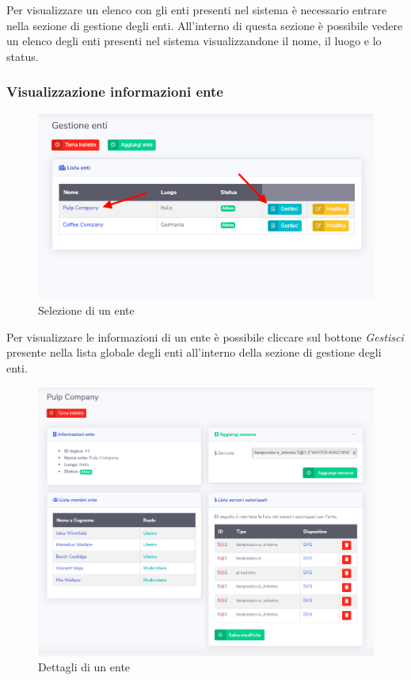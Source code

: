 		Per visualizzare un elenco con gli enti presenti nel sistema è necessario entrare nella sezione di gestione degli enti. All'interno di questa sezione è possibile vedere un elenco degli enti presenti nel sistema visualizzandone il nome, il luogo e lo status.			

	\subsubsection{Visualizzazione informazioni ente}

		\begin{figure}[H]
		\centering
		\includegraphics[scale=0.600]{res/images/admin/selDettEnte.png}
		\caption{Selezione di un ente}
	\end{figure}

		Per visualizzare le informazioni di un ente è possibile cliccare sul bottone \textit{Gestisci} presente nella lista globale degli enti all'interno della sezione di gestione degli enti. 

		\begin{figure}[H]
		\centering
		\includegraphics[scale=0.600]{res/images/admin/dettEnte.png}
		\caption{Dettagli di un ente}
	\end{figure}

